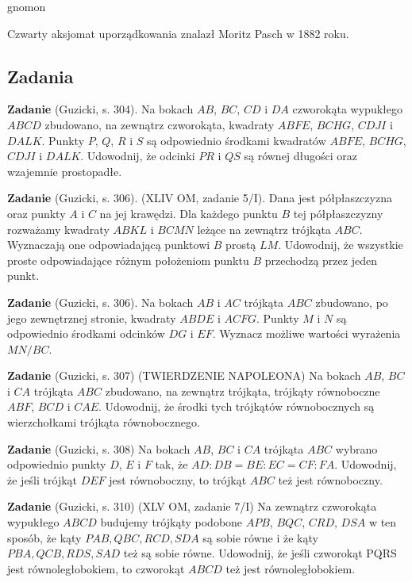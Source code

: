 gnomon %

Czwarty aksjomat uporządkowania znalazł Moritz Pasch \cite{pasch_1882} w 1882 roku.

\subsection{Zadania}
\textbf{Zadanie} (Guzicki, s. 304).
Na bokach $AB$, $BC$, $CD$ i $DA$ czworokąta wypukłego $ABCD$ zbudowano, na zewnątrz czworokąta, kwadraty $ABFE$, $BCHG$, $CDJI$ i $DALK$.
Punkty $P$, $Q$, $R$ i $S$ są odpowiednio środkami kwadratów $ABFE$, $BCHG$, $CDJI$ i $DALK$.
Udowodnij, że odcinki $PR$ i $QS$ są równej długości oraz wzajemnie prostopadłe.

\textbf{Zadanie} (Guzicki, s. 306).
(XLIV OM, zadanie 5/I).
Dana jest półpłaszczyzna oraz punkty $A$ i $C$ na jej krawędzi.
Dla każdego punktu $B$ tej półpłaszczyzny rozważamy kwadraty $ABKL$ i $BCMN$ leżące na zewnątrz trójkąta $ABC$.
Wyznaczają one odpowiadającą punktowi $B$ prostą $LM$.
Udowodnij, że wszystkie proste odpowiadające różnym położeniom punktu $B$ przechodzą przez jeden punkt.

\textbf{Zadanie} (Guzicki, s. 306).
Na bokach $AB$ i $AC$ trójkąta $ABC$ zbudowano, po jego zewnętrznej stronie, kwadraty $ABDE$ i $ACFG$.
Punkty $M$ i $N$ są odpowiednio środkami odcinków $DG$ i $EF$.
Wyznacz możliwe wartości wyrażenia $MN / BC$.

\textbf{Zadanie} (Guzicki, s. 307)
(TWIERDZENIE NAPOLEONA)
Na bokach $AB$, $BC$ i $CA$ trójkąta $ABC$ zbudowano, na zewnątrz trójkąta, trójkąty równoboczne $ABF$, $BCD$ i $CAE$.
Udowodnij, że środki tych trójkątów równobocznych są wierzchołkami trójkąta równobocznego.

\textbf{Zadanie} (Guzicki, s. 308)
Na bokach $AB$, $BC$ i $CA$ trójkąta $ABC$ wybrano odpowiednio punkty $D$, $E$ i $F$ tak, że $AD : DB = BE : EC = CF : FA$.
Udowodnij, że jeśli trójkąt $DEF$ jest równoboczny, to trójkąt $ABC$ też jest równoboczny.

\textbf{Zadanie} (Guzicki, s. 310)
(XLV OM, zadanie 7/I)
Na zewnątrz czworokąta wypukłego $ABCD$ budujemy trójkąty podobone $APB$, $BQC$, $CRD$, $DSA$ w ten sposób, że kąty $PAB, QBC, RCD, SDA$ są sobie równe i że kąty $PBA, QCB, RDS, SAD$ też są sobie równe.
Udowodnij, że jeśli czworokąt PQRS jest równoległobokiem, to czworokąt $ABCD$ też jest równoległobokiem.

%
